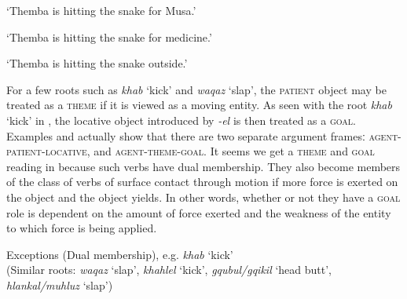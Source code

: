 \documentclass[output=paper]{langsci/langscibook}
\begin{document}

\glt ‘Themba is hitting the snake for Musa.’ 


\glt ‘Themba is hitting the snake for medicine.’ 


\glt ‘Themba is hitting the snake outside.’ 
\z
\z

For a few roots such as \textit{khab} ‘kick’ and \textit{waqaz} ‘slap’, the \textsc{patient} object may be treated as a \textsc{theme} if it is viewed as a moving entity. As seen with the root \textit{khab} ‘kick’ in , the locative object introduced by \textit{-el} is then treated as a \textsc{goal}. Examples  and  actually show that there are two separate argument framesː \textsc{agent-patient-locative}, and \textsc{agent-theme-goal}. It seems we get a \textsc{theme} and \textsc{goal} reading in  because such verbs have dual membership. They also become members of the class of verbs of surface contact through motion if more force is exerted on the object and the object yields. In other words, whether or not they have a \textsc{goal} role is dependent on the amount of force exerted and the weakness of the entity to which force is being applied.

\ea\label{ex:sibanda:12}
\settowidth{}
{Exceptions (Dual membership), e.g. \textit{khab} ‘kick’}\\
 (Similar roots: \textit{waqaz} ‘slap’, \textit{khahlel} ‘kick’, \textit{gqubul/gqikil} ‘head butt’, \textit{hlankal/muhluz} ‘slap’)\\
\end{document}
